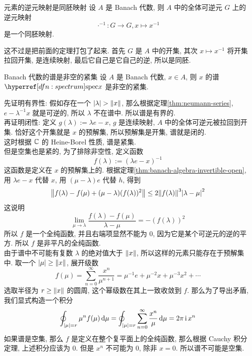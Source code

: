         \begin{thm}
            {元素的逆元映射是同胚映射}
            设 \(A\) 是 Banach 代数, 则 \(A\) 中的全体可逆元 \(G\) 上的逆元映射
            \[{\cdot}^{-1}: G\to G, x\mapsto x^{-1}\]
            是一个同胚映射.
        \end{thm}

        \begin{prf}
            这不过是把前面的定理打包了起来. 首先 \(G\) 是 \(A\) 中的开集, 其次 \(x\mapsto x^{-1}\) 将开集拉回开集, 是连续映射, 最后它自己是它自己的逆, 所以是同胚.
        \end{prf}

        \begin{thm}
            {Banach 代数的谱是非空的紧集}
            设 \(A\) 是 Banach 代数, \(x\in A\), 则 \(x\) 的谱 \(\spec x\) 是非空的紧集.
        \end{thm}

        \begin{prf}
            先证明有界性: 假如存在一个 \(|\lambda|>\norm{x}\), 那么根据定理\ref{thm:neumann-series}, \(e-\lambda^{-1}x\) 就是可逆的, 所以 \(\lambda\) 不在谱中. 所以谱是有界的. \\
            再证明闭性: 定义 \(g(\lambda):=\lambda e-x\), \(g\) 是连续映射, \(A\) 中的全体可逆元被拉回到开集. 恰好这个开集就是 \(x\) 的预解集, 所以预解集是开集, 谱就是闭的. \\
            这时根据 \(\operatorname{\mathbb{C}}\) 的 Heine-Borel 性质, 谱是紧集. \\
            但是空集也是紧的, 为了排除非空性, 定义函数
            \[f(\lambda):=(\lambda e-x)^{-1}\] 
            这函数是定义在 \(x\) 的预解集上的. 根据定理\ref{thm:banach-algebra-invertible-open}, 用 \(\lambda e-x\) 代替 \(x\), 用 \((\mu-\lambda)e\) 代替 \(h\), 得到
            \[\norm{f(\lambda)-f(\mu)+(\mu-\lambda)(f(\lambda))^2}\leq 2\norm{f(\lambda)}^3\abs{\lambda-\mu}^2\]
            这说明
            \[\lim_{\mu\to\lambda}\frac{f(\lambda)-f(\mu)}{\lambda-\mu}=-(f(\lambda))^2\]
            所以 \(f\) 是一个全纯函数, 并且右端项显然不能为 0, 因为它是某个可逆元的逆的平方. 所以 \(f\) 是非平凡的全纯函数. \\
            由于谱中不可能有复数 \(\lambda\) 的绝对值大于 \(\norm{x}\), 所以这样的元素只能存在于预解集中. 取一个 \(\abs{\mu} \geq\norm{x}\), 展开级数
            \[f(\mu)=\sum_{n=0}^{\infty}\frac{x^n}{\mu^{n+1}}=\mu^{-1}e+\mu^{-2}x+\mu^{-3}x^2+\cdots\]  
            选取半径为 \(r\geq\norm{x}\) 的圆周, 这个幂级数在其上一致收敛到 \(f\). 那么为了导出矛盾, 我们显式构造一个积分
            \[\oint_{\abs{\mu}=r} \mu^n f(\mu)\dd{\mu} = \oint_{\abs{\mu}=r} \sum_{n=0}^{\infty}\frac{x^n}{\mu}\dd{\mu} = 2\pi\operatorname{\mathrm{i}} x^n\]
            如果谱是空集, 那么 \(f\) 是定义在整个复平面上的全纯函数, 那么根据 Cauchy 积分定理, 上述积分应该为 0. 但是 \(x^n\) 不可能为 0, 除非 \(x=0\). 所以谱不可能是空集.
        \end{prf}

